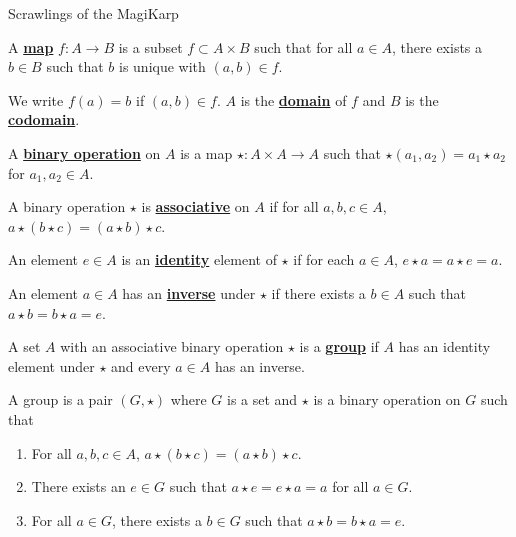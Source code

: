 \documentclass[11pt,letterpaper]{book}
\newcommand{\define}[1]{\underline{\textbf{#1}}}
\theoremstyle{definition}
\begin{document}
\begin{center}
    \vspace*{20pt}
    \LARGE{Scrawlings of the MagiKarp}
\end{center}

\begin{defi}
    A \define{map} $f:A \rightarrow B$ is a subset $f\subset A\times B$ such that for all $a\in A$, there exists a $b\in B$ such that $b$ is unique with $(a,b)\in f$.
\end{defi}

\begin{defi}
    We write $f(a)=b$ if $(a,b)\in f$. $A$ is the \define{domain} of $f$ and $B$ is the \define{codomain}.
\end{defi}

\begin{defi}
    A \define{binary operation} on $A$ is a map $\star:A\times A\rightarrow A$ such that $\star(a_1,a_2)=a_1\star a_2$ for $a_1,a_2\in A$.
\end{defi}

\begin{defi}
    A binary operation $\star$ is \define{associative} on $A$ if for all $a,b,c\in A$, $a\star(b\star c)=(a\star b)\star c$.
\end{defi}

\begin{defi}
    An element $e\in A$ is an \define{identity} element of $\star$ if for each $a\in A$, $e\star a=a\star e=a$.
\end{defi}

\begin{defi}
    An element $a\in A$ has an \define{inverse} under $\star$ if there exists a $b\in A$ such that $a\star b=b\star a=e$.
\end{defi}

\begin{defi}
    A set $A$ with an associative binary operation $\star$ is a \define{group} if $A$ has an identity element under $\star$ and every $a\in A$ has an inverse.
\end{defi}

\begin{bdefi}
    A group is a pair $(G,\star)$ where $G$ is a set and $\star$ is a binary operation on $G$ such that
    \begin{enumerate}
        \item For all $a,b,c\in A$, $a\star(b\star c)=(a\star b)\star c$.
        \item There exists an $e\in G$ such that $a\star e=e\star a=a$ for all $a\in G$.
        \item For all $a\in G$, there exists a $b\in G$ such that $a\star b=b\star a=e$.
    \end{enumerate}
\end{bdefi}
\end{document}
